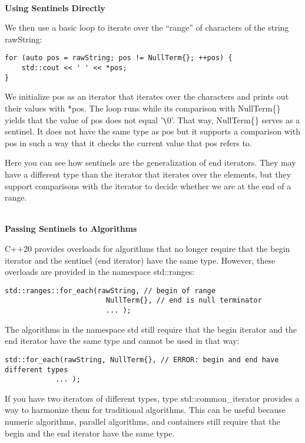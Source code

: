 \noindent
\hspace*{\fill} \\ %
\textbf{Using Sentinels Directly}

We then use a basic loop to iterate over the “range” of characters of the string rawString:

\begin{lstlisting}[style=styleCXX]
for (auto pos = rawString; pos != NullTerm{}; ++pos) {
	std::cout << ' ' << *pos;
}
\end{lstlisting}

We initialize pos as an iterator that iterates over the characters and prints out their values with *pos. The loop runs while its comparison with NullTerm\{\} yields that the value of pos does not equal ’\verb|\|0’. That way, NullTerm\{\} serves as a sentinel. It does not have the same type as pos but it supports a comparison with pos in such a way that it checks the current value that pos refers to.

Here you can see how sentinels are the generalization of end iterators. They may have a different type than the iterator that iterates over the elements, but they support comparisons with the iterator to decide whether we are at the end of a range.

\noindent
\hspace*{\fill} \\ %
\textbf{Passing Sentinels to Algorithms}

C++20 provides overloads for algorithms that no longer require that the begin iterator and the sentinel (end iterator) have the same type. However, these overloads are provided in the namespace std::ranges:

\begin{lstlisting}[style=styleCXX]
std::ranges::for_each(rawString, // begin of range
						NullTerm{}, // end is null terminator
						... );
\end{lstlisting}

The algorithms in the namespace std still require that the begin iterator and the end iterator have the same type and cannot be used in that way:

\begin{lstlisting}[style=styleCXX]
std::for_each(rawString, NullTerm{}, // ERROR: begin and end have different types
			... );
\end{lstlisting}

If you have two iterators of different types, type std::common\_iterator provides a way to harmonize them for traditional algorithms. This can be useful because numeric algorithms, parallel algorithms, and containers still require that the begin and the end iterator have the same type.

